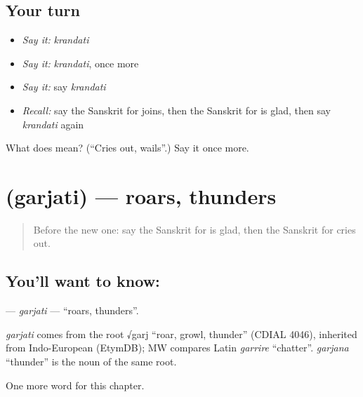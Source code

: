 \subsection*{Your turn}
\begin{itemize}
\raggedright
  \item \emph{Say it:} \emph{krandati}
  \item \emph{Say it:} \emph{krandati}, once more
  \item \emph{Say it:} say \emph{krandati}
  \item \emph{Recall:} say the Sanskrit for joins, then the Sanskrit for is glad, then say \emph{krandati} again
\end{itemize}

\begin{tcolorbox}[breakable,colback=teal!4,colframe=teal!35!black,title={Before you move on}]
What does  mean? (\textquotedblleft{}Cries out, wails\textquotedblright{}.) Say it once more.
\end{tcolorbox}
\section[\texorpdfstring{\sk{गर्जति} (garjati)}{गर्जति (garjati)}]{ (garjati) — roars, thunders}

\label{lesson:SA-C145-garjati}



\begin{quote}
Before the new one: say the Sanskrit for is glad, then the Sanskrit for cries out.
\end{quote}

\subsection*{You'll want to know: }
\textbf{} — \emph{garjati} — \textquotedblleft{}roars, thunders\textquotedblright{}.

\begin{cousinweb}
\emph{garjati} comes from the root √garj \textquotedblleft{}roar, growl, thunder\textquotedblright{} (CDIAL 4046), inherited from Indo-European (EtymDB); MW compares Latin \emph{garrire} \textquotedblleft{}chatter\textquotedblright{}. \emph{garjana} \textquotedblleft{}thunder\textquotedblright{} is the noun of the same root.
\end{cousinweb}

\begin{grammarlens}[title={What you've built}]
One more word for this chapter.
\end{grammarlens}

